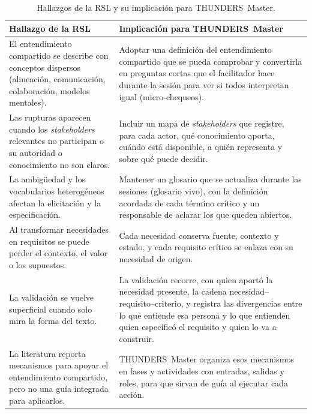 \documentclass[12pt,letterpaper,oneside]{report}
\begin{document}
\begin{table}[H]
\caption{Hallazgos de la RSL y su implicación para THUNDERS~Master.}
\label{tab:rsl_implications}
\centering
\footnotesize
\renewcommand{\arraystretch}{1.15}
\begin{tabularx}{\textwidth}{@{}L{6.0cm}Y@{}}
\toprule
\textbf{Hallazgo de la RSL} & \textbf{Implicación para THUNDERS~Master} \\
\midrule
El entendimiento compartido se describe con conceptos dispersos
(alineación, comunicación, colaboración, modelos mentales). &
Adoptar una definición del entendimiento compartido que se pueda comprobar y
convertirla en preguntas cortas que el facilitador hace durante la sesión para
ver si todos interpretan igual (micro-chequeos). \\
\midrule
Las rupturas aparecen cuando los \textit{stakeholders} relevantes no participan o
su autoridad o conocimiento no son claros. &
Incluir un mapa de \textit{stakeholders} que registre, para cada actor, qué
conocimiento aporta, cuándo está disponible, a quién representa y sobre qué
puede decidir. \\
\midrule
La ambigüedad y los vocabularios heterogéneos afectan la elicitación y la
especificación. &
Mantener un glosario que se actualiza durante las sesiones (glosario vivo),
con la definición acordada de cada término crítico y un responsable de aclarar
los que queden abiertos. \\
\midrule
Al transformar necesidades en requisitos se puede perder el contexto, el valor
o los supuestos. &
Cada necesidad conserva fuente, contexto y estado, y cada requisito crítico se
enlaza con su necesidad de origen. \\
\midrule
La validación se vuelve superficial cuando solo mira la forma del texto. &
La validación recorre, con quien aportó la necesidad presente, la cadena
necesidad--requisito--criterio, y registra las divergencias entre lo que
entiende esa persona y lo que entienden quien especificó el requisito y quien lo
va a construir. \\
\midrule
La literatura reporta mecanismos para apoyar el entendimiento compartido, pero
no una guía integrada para aplicarlos. &
THUNDERS~Master organiza esos mecanismos en fases y actividades con entradas,
salidas y roles, para que sirvan de guía al ejecutar cada acción. \\
\bottomrule
\end{tabularx}
\end{table}
\end{document}
